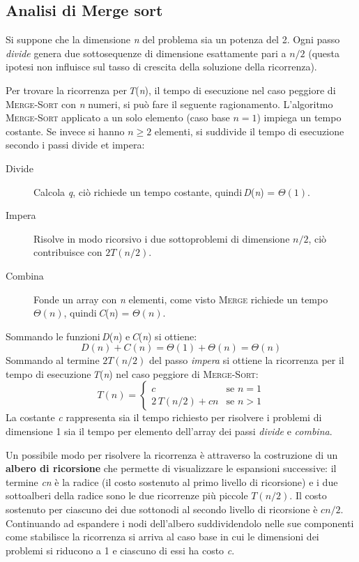 \documentclass[10pt, a4paper]{report}
\begin{document}
\subsection{Analisi di Merge sort}
Si suppone che la dimensione \textit{n} del problema sia un potenza del 2. Ogni passo \textsl{divide} genera due sottosequenze di dimensione esattamente pari a $n/2$ (questa ipotesi non influisce sul tasso di crescita della soluzione della ricorrenza).

Per trovare la ricorrenza per\,\textit{T}(\textit{n}), il tempo di esecuzione nel caso peggiore di \textsc{Merge-Sort} con \textit{n} numeri, si può fare il seguente ragionamento. L'algoritmo \textsc{Merge-Sort} applicato a un solo elemento (caso base $ n = 1$) impiega un tempo costante. Se invece si hanno $n \geq 2$ elementi, si suddivide il tempo di esecuzione secondo i passi divide et impera:
\begin{description}
\item[Divide]Calcola \textit{q}, ciò richiede un tempo costante, quindi\,\textit{D}(\textit{n}) = $\Theta(1)$.
\item[Impera]Risolve in modo ricorsivo i due sottoproblemi di dimensione $n/2$, ciò contribuisce con $2T(n/2)$.
\item[Combina]Fonde un array con \textit{n} elementi, come visto \textsc{Merge}  richiede un tempo $\Theta(n)$, quindi\,\textit{C}(\textit{n}) = $\Theta(n)$.
\end{description}
Sommando le funzioni\,\textit{D}(\textit{n}) e\,\textit{C}(\textit{n}) si ottiene:
\begin{equation*}
D(n) + C(n) = \Theta(1) + \Theta(n) = \Theta(n)
\end{equation*}
Sommando al termine $2T(n/2)$ del passo \textsl{impera} si ottiene la ricorrenza per il tempo di esecuzione\,\textit{T}(\textit{n}) nel caso peggiore di \textsc{Merge-Sort}:
\begin{equation}
T(n) = \left\{
\begin{array}{ll}
c & \text{se $n =  1$} \\
2\,T(n/2) + cn & \text{se $n > 1$}
\end{array}\right.
\label{ricorrenza}
\end{equation}
La costante \textit{c} rappresenta sia il tempo richiesto per risolvere i problemi di dimensione 1 sia il tempo per elemento dell'array dei passi \textsl{divide} e \textsl{combina}.

Un possibile modo per risolvere la ricorrenza è attraverso la costruzione di un \textbf{albero di ricorsione} che permette di visualizzare le espansioni successive: il termine \textit{cn} è la radice (il costo sostenuto al primo livello di ricorsione) e i due sottoalberi della radice sono le due ricorrenze più piccole $T(n/2)$. Il costo sostenuto per ciascuno dei due sottonodi al secondo livello di ricorsione è $cn/2$. Continuando ad espandere i nodi dell'albero suddividendolo nelle sue componenti come stabilisce la ricorrenza si arriva al caso base in cui le dimensioni dei problemi si riducono a 1 e ciascuno di essi ha costo \textit{c}.
\end{document}
